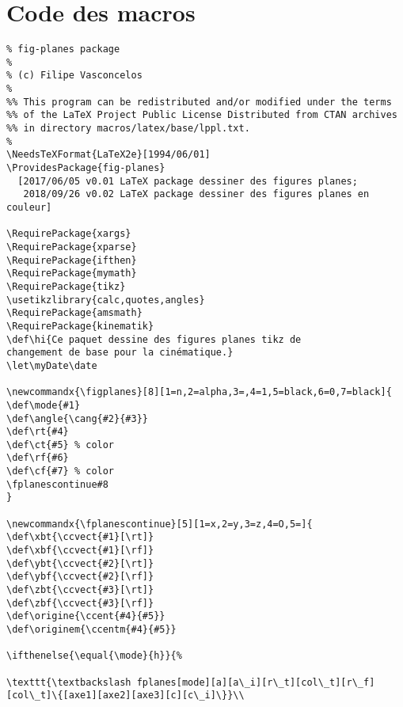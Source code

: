 \documentclass[a4paper,9pt]{article}
\begin{document}
\section{Code des macros}
\footnotesize
\begin{verbatim}
% fig-planes package
% 
% (c) Filipe Vasconcelos
%
%% This program can be redistributed and/or modified under the terms
%% of the LaTeX Project Public License Distributed from CTAN archives
%% in directory macros/latex/base/lppl.txt.
% 
\NeedsTeXFormat{LaTeX2e}[1994/06/01]
\ProvidesPackage{fig-planes}
  [2017/06/05 v0.01 LaTeX package dessiner des figures planes;
   2018/09/26 v0.02 LaTeX package dessiner des figures planes en couleur]

\RequirePackage{xargs}
\RequirePackage{xparse}
\RequirePackage{ifthen}
\RequirePackage{mymath}
\RequirePackage{tikz}
\usetikzlibrary{calc,quotes,angles}
\RequirePackage{amsmath}
\RequirePackage{kinematik}
\def\hi{Ce paquet dessine des figures planes tikz de 
changement de base pour la cinématique.}
\let\myDate\date

\newcommandx{\figplanes}[8][1=n,2=alpha,3=,4=1,5=black,6=0,7=black]{ 
\def\mode{#1}
\def\angle{\cang{#2}{#3}}
\def\rt{#4}
\def\ct{#5} % color
\def\rf{#6}
\def\cf{#7} % color
\fplanescontinue#8
}

\newcommandx{\fplanescontinue}[5][1=x,2=y,3=z,4=O,5=]{ 
\def\xbt{\ccvect{#1}[\rt]}
\def\xbf{\ccvect{#1}[\rf]}
\def\ybt{\ccvect{#2}[\rt]}
\def\ybf{\ccvect{#2}[\rf]}
\def\zbt{\ccvect{#3}[\rt]}
\def\zbf{\ccvect{#3}[\rf]}
\def\origine{\ccent{#4}{#5}}
\def\originem{\ccentm{#4}{#5}}

\ifthenelse{\equal{\mode}{h}}{%

\texttt{\textbackslash fplanes[mode][a][a\_i][r\_t][col\_t][r\_f][col\_t]\{[axe1][axe2][axe3][c][c\_i]\}}\\


\end{verbatim}
\end{document}
